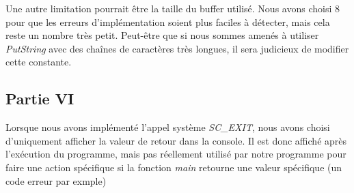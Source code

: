 \documentclass{article}
\begin{document}
Une autre limitation pourrait être la taille du buffer utilisé. Nous avons
choisi 8 pour que les erreurs d'implémentation soient plus faciles à détecter,
mais cela reste un nombre très petit. Peut-être que si nous sommes amenés à
utiliser \textit{PutString} avec des chaînes de caractères très longues, il
sera judicieux de modifier cette constante.

\subsection{Partie VI}
Lorsque nous avons implémenté l'appel système \textit{SC\_EXIT}, nous avons choisi d'uniquement afficher
la valeur de retour dans la console. Il est donc affiché après l'exécution du programme, mais pas réellement
utilisé par notre programme pour faire une action spécifique si la fonction \textit{main} retourne une valeur spécifique
(un code erreur par exmple)
\end{document}
